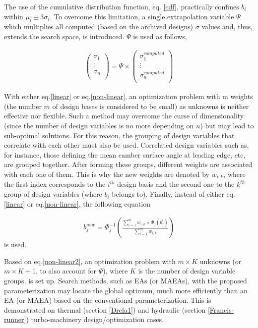 The use of the cumulative distribution function, eq. \ref{cdf}, practically confines $b_i$ within $\mu _i \pm 3\sigma _i$. To overcome this limitation, a single extrapolation variable $\Psi$ which multiplies all computed (based on the archived designs) $\sigma$ values and, thus, extends the search space, is introduced. $\Psi$ is used as follows,


\begin{eqnarray}
		\left( {\begin{array}{c}
 		\sigma _1  \\
 		\vdots  \\
 		\sigma _n  \\
 		\end{array} } \right) =
 		\Psi \times 
 		\left( {\begin{array}{c}
 		\sigma _1^{computed}  \\
 		\vdots  \\
 		\sigma _n^{computed}  \\
 		\end{array} } \right)
   \label{cdf-matrix} 
\end{eqnarray}

With either eq.\ref{linear} or eq.\ref{non-linear}, an optimization problem with m weights (the number $m$ of design bases is considered to be small) as unknowns is neither effective nor flexible. Such a method may overcome the curse of dimensionality (since the number of design variables is no more depending on $n$) but may lead to sub-optimal solutions. For this reason, the grouping of design variables that correlate with each other must also be used. Correlated design variables such as, for instance, those defining the mean camber surface angle at leading edge, etc, are grouped together. After forming these groups, different weights are associated with each one of them. This is why the new weights are denoted by $w_{i,k}$, where the first index corresponds to the $i^{th}$ design basis and the second one to the $k^{th}$ group of design variables (where $b_i$ belongs to). Finally, instead of either eq.\ref{linear} or eq.\ref{non-linear}, the following equation


\begin{eqnarray}
   b_j^{new} = \Phi _j^{-1} (\frac{\sum_{i=1}^{m}w_{i,k} \times \Phi _j(b_j^i)}{\sum_{i=1}^{m}w_{i,k} }) 
   \label{non-linear2} 
\end{eqnarray}
is used. 

Based on eq.\ref{non-linear2}, an optimization problem with $m \times K$ unknowns (or $m\times K+1$, to also account for $\Psi$), where $K$ is the number of design variable groups, is set up. Search methods, such as EAs (or MAEAs), with the proposed parameterization may locate the global optimum, much more efficiently than an EA (or MAEA) based on the conventional parameterization. This is demonstrated on thermal (section \ref{Drela1}) and hydraulic (section \ref{Francis-runner}) turbo-machinery design/optimization cases. 


